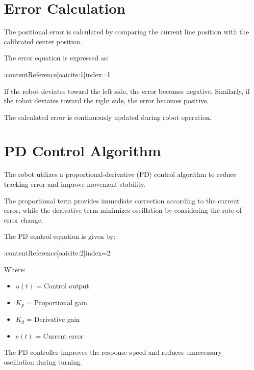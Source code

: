 \documentclass[12pt,a4paper,oneside]{report}
\begin{document}
\section{Error Calculation}

The positional error is calculated by comparing the current line position with the calibrated center position.

The error equation is expressed as:

:contentReference[oaicite:1]{index=1}

If the robot deviates toward the left side, the error becomes negative. Similarly, if the robot deviates toward the right side, the error becomes positive.

The calculated error is continuously updated during robot operation.


\section{PD Control Algorithm}

The robot utilizes a proportional-derivative (PD) control algorithm to reduce tracking error and improve movement stability.

The proportional term provides immediate correction according to the current error, while the derivative term minimizes oscillation by considering the rate of error change.

The PD control equation is given by:

:contentReference[oaicite:2]{index=2}

Where:

\begin{itemize}
\item \(u(t)\) = Control output
\item \(K_p\) = Proportional gain
\item \(K_d\) = Derivative gain
\item \(e(t)\) = Current error
\end{itemize}

The PD controller improves the response speed and reduces unnecessary oscillation during turning.

\end{document}

